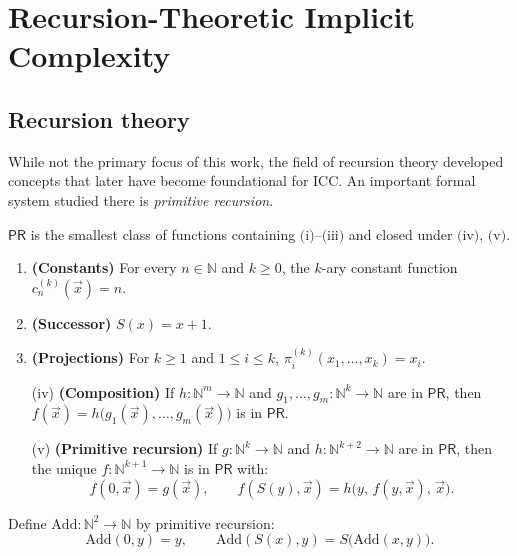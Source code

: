 
\chapter{Recursion-Theoretic Implicit Complexity}
\label{chap:recursion-theory}

\section{Recursion theory}
While not the primary focus of this work, the field of recursion theory developed concepts
that later have become foundational for ICC\@. An important formal system studied there is \emph{primitive recursion}.

\begin{definition}
\(\mathsf{PR}\) is the smallest class of functions containing \(\text{(i)}\)--\(\text{(iii)}\) and closed under \(\text{(iv)}\), \(\text{(v)}\).
\begin{enumerate}[label=(\roman*)]
\item \textbf{(Constants)} For every \(n\in\mathbb{N}\) and \(k\ge 0\), the \(k\)-ary constant function
      \(c_{n}^{(k)}(\vec x)=n\).
\item \textbf{(Successor)} \(S(x)=x+1\).
\item \textbf{(Projections)} For \(k\ge 1\) and \(1\le i\le k\),
      \(\pi_i^{(k)}(x_1,\dots,x_k)=x_i\).
\item[(iv)] \textbf{(Composition)} If \(h:\mathbb{N}^m\to\mathbb{N}\) and
      \(g_1,\dots,g_m:\mathbb{N}^k\to\mathbb{N}\) are in \(\mathsf{PR}\), then
      \(f(\vec x)=h\big(g_1(\vec x),\dots,g_m(\vec x)\big)\) is in \(\mathsf{PR}\).
\item[(v)] \textbf{(Primitive recursion)} If \(g:\mathbb{N}^k\to\mathbb{N}\) and
      \(h:\mathbb{N}^{k+2}\to\mathbb{N}\) are in \(\mathsf{PR}\), then the unique
      \(f:\mathbb{N}^{k+1}\to\mathbb{N}\) is in \(\mathsf{PR}\) with:
      \[
      f(0,\vec x)=g(\vec x),\qquad
      f(S(y),\vec x)=h\big(y,\,f(y,\vec x),\,\vec x\big).
      \]

\end{enumerate}
\end{definition}

\begin{example}[Addition]
Define \(\mathrm{Add}:\mathbb{N}^2\to\mathbb{N}\) by primitive recursion:
\[
\mathrm{Add}(0,y)=y, \qquad
\mathrm{Add}(S(x),y)=S\big(\mathrm{Add}(x,y)\big).
\]
\end{example}


